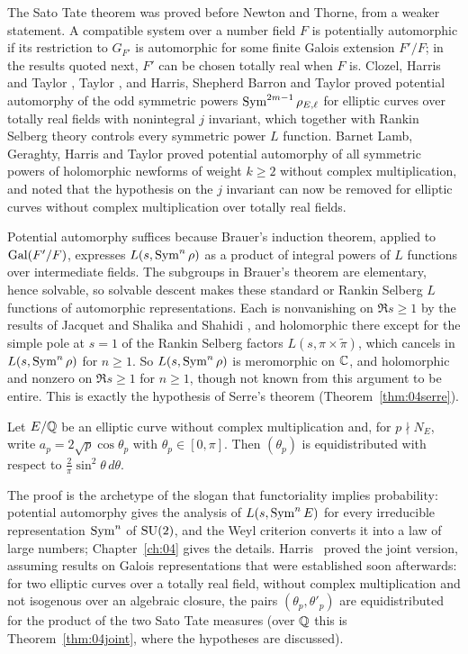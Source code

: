 The Sato Tate theorem was proved before Newton and Thorne, from a weaker statement. A compatible system over a number field $F$ is potentially automorphic if its restriction to $G_{F'}$ is automorphic for some finite Galois extension $F'/F$; in the results quoted next, $F'$ can be chosen totally real when $F$ is. Clozel, Harris and Taylor \cite{cht2008}, Taylor \cite{taylor2008}, and Harris, Shepherd Barron and Taylor \cite{hsbt2010} proved potential automorphy of the odd symmetric powers $\operatorname{Sym}^{2m-1}\rho_{E,\ell}$ for elliptic curves over totally real fields with nonintegral $j$ invariant, which together with Rankin Selberg theory controls every symmetric power $L$ function. Barnet Lamb, Geraghty, Harris and Taylor \cite{blght2011} proved potential automorphy of all symmetric powers of holomorphic newforms of weight $k\ge2$ without complex multiplication, and noted that the hypothesis on the $j$ invariant can now be removed for elliptic curves without complex multiplication over totally real fields.

Potential automorphy suffices because Brauer's induction theorem, applied to $\operatorname{Gal}(F'/F)$, expresses $L(s,\operatorname{Sym}^n\rho)$ as a product of integral powers of $L$ functions over intermediate fields. The subgroups in Brauer's theorem are elementary, hence solvable, so solvable descent \cite{arthurclozel1989} makes these standard or Rankin Selberg $L$ functions of automorphic representations. Each is nonvanishing on $\Re s\ge1$ by the results of Jacquet and Shalika \cite{jacquetshalika1976} and Shahidi \cite{shahidi1981}, and holomorphic there except for the simple pole at $s=1$ of the Rankin Selberg factors $L(s,\pi\times\tilde\pi)$, which cancels in $L(s,\operatorname{Sym}^n\rho)$ for $n\ge1$. So $L(s,\operatorname{Sym}^n\rho)$ is meromorphic on $\mathbb{C}$, and holomorphic and nonzero on $\Re s\ge1$ for $n\ge1$, though not known from this argument to be entire. This is exactly the hypothesis of Serre's theorem (Theorem~\ref{thm:04serre}).

\begin{theorem}\label{thm:ch3ST}
Let $E/\mathbb{Q}$ be an elliptic curve without complex multiplication and, for $p\nmid N_E$, write $a_p=2\sqrt p\cos\theta_p$ with $\theta_p\in[0,\pi]$. Then $(\theta_p)$ is equidistributed with respect to $\frac2\pi\sin^2\theta\,d\theta$.
\end{theorem}

The proof is the archetype of the slogan that functoriality implies probability: potential automorphy gives the analysis of $L(s,\operatorname{Sym}^n E)$ for every irreducible representation $\operatorname{Sym}^n$ of $\mathrm{SU}(2)$, and the Weyl criterion converts it into a law of large numbers; Chapter~\ref{ch:04} gives the details. Harris~\cite{harris2009} proved the joint version, assuming results on Galois representations that were established soon afterwards: for two elliptic curves over a totally real field, without complex multiplication and not isogenous over an algebraic closure, the pairs $(\theta_p,\theta'_p)$ are equidistributed for the product of the two Sato Tate measures (over $\mathbb{Q}$ this is Theorem~\ref{thm:04joint}, where the hypotheses are discussed).

